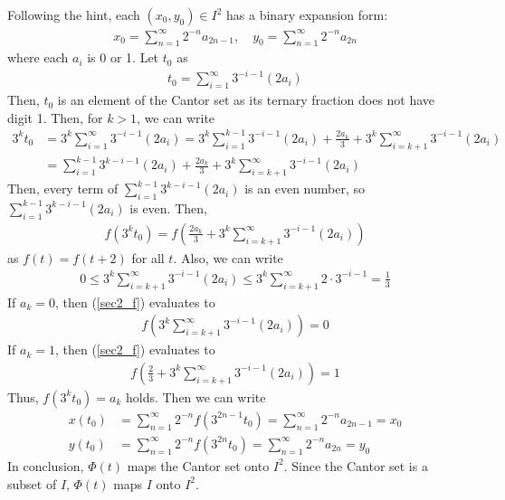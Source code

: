 \documentclass{scrartcl}
\begin{document}
Following the hint, each \((x_0, y_0) \in I^2\) has a binary expansion form:
\begin{align*}
  x_0 = \sum^\infty_{n = 1} 2^{-n} a_{2n - 1}, \quad
  y_0 = \sum^\infty_{n = 1} 2^{-n} a_{2n}
\end{align*}
where each \(a_i\) is 0 or 1. Let \(t_0\) as
\begin{align*}
  t_0 = \sum^\infty_{i = 1} 3^{-i - 1} (2a_i)
\end{align*}
Then, \(t_0\) is an element of the Cantor set as its ternary fraction does not
have digit 1. Then, for \(k > 1\), we can write
\begin{align*}
  3^k t_0
  &= 3^k \sum^\infty_{i = 1} 3^{-i - 1} (2a_i)
  = 3^k \sum^{k - 1}_{i = 1} 3^{-i - 1} (2a_i)
    + \frac{2a_k}{3} + 3^k \sum^\infty_{i = k + 1} 3^{-i - 1} (2a_i) \\
  &= \sum^{k - 1}_{i = 1} 3^{k - i - 1} (2a_i)
    + \frac{2a_k}{3} + 3^k \sum^\infty_{i = k + 1} 3^{-i - 1} (2a_i)
\end{align*}
Then, every term of \(\sum^{k - 1}_{i = 1} 3^{k - i - 1} (2a_i)\) is an even
number, so \(\sum^{k - 1}_{i = 1} 3^{k - i - 1} (2a_i)\) is even. Then,
\begin{align}\label{sec2_f}
  f(3^k t_0)
  = f \left( \frac{2a_k}{3} + 3^k \sum^\infty_{i = k + 1} 3^{-i - 1} (2a_i) \right)
\end{align}
as \(f(t) = f(t + 2)\) for all \(t\). Also, we can write
\begin{align*}
  0
  \le 3^k \sum^\infty_{i = k + 1} 3^{-i - 1} (2a_i)
  \le 3^k \sum^\infty_{i = k + 1} 2 \cdot 3^{-i - 1}
  = \frac{1}{3}
\end{align*}
If \(a_k = 0\), then (\ref{sec2_f}) evaluates to
\begin{align*}
  f \left( 3^k \sum^\infty_{i = k + 1} 3^{-i - 1} (2a_i) \right) = 0
\end{align*}
If \(a_k = 1\), then (\ref{sec2_f}) evaluates to
\begin{align*}
  f \left( \frac{2}{3} + 3^k \sum^\infty_{i = k + 1} 3^{-i - 1} (2a_i) \right)
  = 1
\end{align*}
Thus, \(f(3^k t_0) = a_k\) holds. Then we can write
\begin{align*}
  x(t_0)
  &= \sum^\infty_{n = 1} 2^{-n} f(3^{2n - 1} t_0)
  = \sum^\infty_{n = 1} 2^{-n} a_{2n - 1}
  = x_0 \\
  y(t_0)
  &= \sum^\infty_{n = 1} 2^{-n} f(3^{2n} t_0)
  = \sum^\infty_{n = 1} 2^{-n} a_{2n}
  = y_0
\end{align*}
In conclusion, \(\Phi(t)\) maps the Cantor set onto \(I^2\). Since the Cantor
set is a subset of \(I\), \(\Phi(t)\) maps \(I\) onto \(I^2\).
\end{document}
